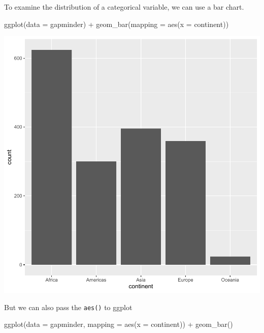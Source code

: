 \documentclass[
]{book}
\makeatletter
\newenvironment{Shaded}{\begin{snugshade}}{\end{snugshade}}
\newcommand{\AttributeTok}[1]{\textcolor[rgb]{0.61,0.61,0.61}{#1}}
\newcommand{\FunctionTok}[1]{\textcolor[rgb]{0,0,0}{#1}}
\newcommand{\NormalTok}[1]{#1}
\newcommand{\SpecialCharTok}[1]{\textcolor[rgb]{0,0,0}{#1}}
\newenvironment{kframe}{%
\medskip{}
\setlength{\fboxsep}{.8em}
 \def\at@end@of@kframe{}%
 \ifinner\ifhmode%
  \def\at@end@of@kframe{\end{minipage}}%
  \begin{minipage}{\columnwidth}%
 \fi\fi%
 \def\FrameCommand##1{\hskip\@totalleftmargin \hskip-\fboxsep
 \colorbox{shadecolor}{##1}\hskip-\fboxsep
     \hskip-\linewidth \hskip-\@totalleftmargin \hskip\columnwidth}%
 \MakeFramed {\advance\hsize-\width
   \@totalleftmargin\z@ \linewidth\hsize
   \@setminipage}}%
 {\par\unskip\endMakeFramed%
 \at@end@of@kframe}
\renewenvironment{Shaded}{\begin{kframe}}{\end{kframe}}
\makeatother
\begin{document}
To examine the distribution of a categorical variable, we can use a bar chart.

\begin{Shaded}
\begin{Highlighting}[]
\FunctionTok{ggplot}\NormalTok{(}\AttributeTok{data =}\NormalTok{ gapminder) }\SpecialCharTok{+} 
  \FunctionTok{geom\_bar}\NormalTok{(}\AttributeTok{mapping =} \FunctionTok{aes}\NormalTok{(}\AttributeTok{x =}\NormalTok{ continent))}
\end{Highlighting}
\end{Shaded}

\begin{center}\includegraphics[width=0.7\linewidth,keepaspectratio]{Multivariable_Data_Analysis_files/figure-latex/unnamed-chunk-67-1} \end{center}

But we can also pass the \texttt{aes()} to ggplot

\begin{Shaded}
\begin{Highlighting}[]
\FunctionTok{ggplot}\NormalTok{(}\AttributeTok{data =}\NormalTok{ gapminder, }\AttributeTok{mapping =} \FunctionTok{aes}\NormalTok{(}\AttributeTok{x =}\NormalTok{ continent)) }\SpecialCharTok{+} 
  \FunctionTok{geom\_bar}\NormalTok{()}
\end{Highlighting}
\end{Shaded}
\end{document}
